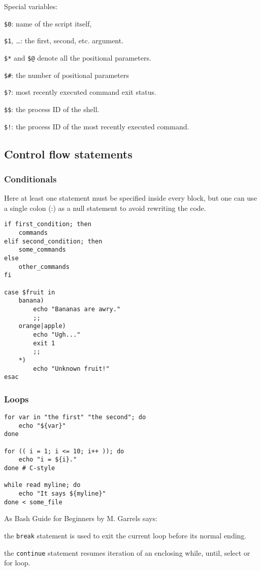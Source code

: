 Special variables:
\begin{enumx}
	\item \texttt{\$0}: name of the script itself,
	\item \texttt{\$1}, \ldots: the first, second, etc. argument.
	\item \texttt{\$*} and \texttt{\$@} denote all the positional parameters.
	\item \texttt{\$\#}: the number of positional parameters
	\item \texttt{\$?}: most recently executed command exit status.
	\item \texttt{\$\$}: the process ID of the shell.
	\item \texttt{\$!}: the process ID of the most recently executed command.
\end{enumx}

\subsection{Control flow statements}
\subsubsection{Conditionals}
Here at least one statement must be specified inside every block,
but one can use a single colon (:) as a null statement to avoid
rewriting the code.

\begin{verbatim}
if first_condition; then
    commands
elif second_condition; then
    some_commands
else
    other_commands	
fi

case $fruit in
    banana)
        echo "Bananas are awry."
        ;;
    orange|apple)
        echo "Ugh..."
        exit 1
        ;;
    *)
        echo "Unknown fruit!"
esac
\end{verbatim}

\subsubsection{Loops}
\begin{verbatim}
for var in "the first" "the second"; do
    echo "${var}"
done

for (( i = 1; i <= 10; i++ )); do
    echo "i = ${i}."
done # C-style

while read myline; do
    echo "It says ${myline}"
done < some_file
\end{verbatim}

As Bash Guide for Beginners by M. Garrels says:
\begin{enumx}
\item the \texttt{break} statement is used to 
exit the current loop before its normal ending. 
\item the \texttt{continue} statement resumes iteration 
of an enclosing while, until, select or for loop.
\end{enumx}



